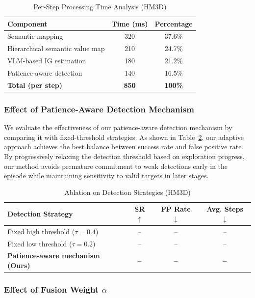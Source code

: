 \documentclass[conference]{IEEEtran}
\begin{document}
\begin{table}[t]
\centering
\caption{Per-Step Processing Time Analysis (HM3D)}
\label{tab:timing}
\begin{tabular}{l|c|c}
\toprule
Component & Time (ms) & Percentage \\
\midrule
Semantic mapping & 320 & 37.6\% \\
Hierarchical semantic value map & 210 & 24.7\% \\
VLM-based IG estimation & 180 & 21.2\% \\
Patience-aware detection & 140 & 16.5\% \\
\midrule
\textbf{Total (per step)} & \textbf{850} & \textbf{100\%} \\
\bottomrule
\end{tabular}
\end{table}

\subsubsection{Effect of Patience-Aware Detection Mechanism}

We evaluate the effectiveness of our patience-aware detection mechanism by comparing it with fixed-threshold strategies. As shown in Table~\ref{tab:ablation_detection}, our adaptive approach achieves the best balance between success rate and false positive rate. By progressively relaxing the detection threshold based on exploration progress, our method avoids premature commitment to weak detections early in the episode while maintaining sensitivity to valid targets in later stages.

\begin{table}[t]
\centering
\caption{Ablation on Detection Strategies (HM3D)}
\label{tab:ablation_detection}
\begin{tabular}{l|ccc}
\toprule
Detection Strategy & SR $\uparrow$ & FP Rate $\downarrow$ & Avg. Steps $\downarrow$ \\
\midrule
Fixed high threshold ($\tau=0.4$) & -- & -- & -- \\
Fixed low threshold ($\tau=0.2$) & -- & -- & -- \\
\textbf{Patience-aware mechanism (Ours)} & \textbf{--} & \textbf{--} & \textbf{--} \\
\bottomrule
\end{tabular}
\end{table}

\subsubsection{Effect of Fusion Weight $\alpha$}
\end{document}
